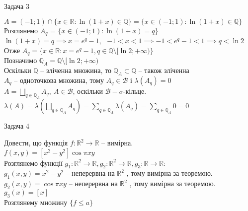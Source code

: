 \documentclass[12 pt]{article}
\begin{document}
\begin{center}
    \Large 
    Задача 3
\end{center}
$A = (-1;1) \cap \{ x \in \mathbb{R} : \ln{(1+x)} \in \mathbb{Q} \}= \{ x \in (-1;1) : \ln{(1+x)} \in \mathbb{Q} \}$ \\ 
Розглянемо $A_q$  = $\{ x \in (-1;1) : \ln{(1+x)} = q \}$ \\ 
$\ln{(1+x)} = q \implies x= e^q - 1$, \ $-1 < x < 1 \implies -1 < e^q -1 < 1 \implies q < \ln2$ \\  
Отже $A_q = \{ x \in \mathbb{R} : x = e^q-1, q \in \mathbb{Q}\setminus[\ln2; +\infty ) \}$ \\ 
Позначимо $\mathbb{Q}_A = \mathbb{Q} \setminus [\ln2; +\infty )$ \\ 
Оскільки $\mathbb{Q}$ -- зліченна множина, то 
$\mathbb{Q}_A \subset \mathbb{Q}$ -- також зліченна \\ 
$A_q$ -- одноточкова множина, тому $A_q \in \mathcal{B}$ і $\lambda(A_q) = 0$  \\ 
$A = \bigsqcup_{q \in \mathbb{Q}_A}\limits A_q, \ A \in \mathcal{B} $,
 оскільки $\mathcal{B} - \sigma\text{-кільце}$. \\ 
$\lambda(A) = \lambda\left(\bigsqcup_{q \in \mathbb{Q}_A}\limits A_q\right) = 
\sum_{q \in \mathbb{Q}_A}\limits\lambda(A_q) = \sum_{q \in \mathbb{Q}_A}\limits0 = 0$ 

\begin{center}
    \Large 
    Задача 4
\end{center}
Довести, що функція $f: \mathbb{R}^2 \to \mathbb{R}$ -- вимірна. \\ 
$f(x,y) = [x^2-y^2] \cos{\pi x y}$ \\ 
Розглянемо функції $g_1 : \mathbb{R}^2 \to \mathbb{R}, g_2 : \mathbb{R}^2 \to \mathbb{R}, g_3: \mathbb{R}\to \mathbb{R}$: \\ 
$g_1 (x,y) = x^2 - y^2$ -- неперервна на $\mathbb{R}^2$ , тому вимірна за теоремою. \\ 
$g_2 (x,y) = \cos{\pi x y}$  -- неперервна на $\mathbb{R}^2$ , тому вимірна за теоремою. \\ 
$g_3 (x) = [x]$ \\ 
Розглянему множину $\{ f \leq a \}$ 
\end{document}
